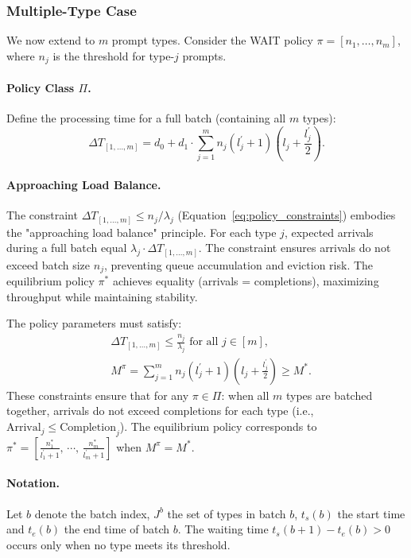 \subsubsection{Multiple-Type Case}

We now extend to $m$ prompt types. Consider the WAIT policy $\pi = [n_1,\ldots,n_m]$, where $n_j$ is the threshold for type-$j$ prompts.

\paragraph{Policy Class $\Pi$.} Define the processing time for a full batch (containing all $m$ types):
\begin{equation}\label{eq:batch_time_def}
\Delta T_{[1,\ldots,m]} =  d_0 + d_1 \cdot \sum_{j=1}^m n_j(l_j^\prime+1)\left( l_j+\frac{l_j^\prime}{2} \right).
\end{equation}

\paragraph{Approaching Load Balance.}
The constraint $\Delta T_{[1,\ldots,m]} \leq n_j/\lambda_j$ (Equation~\ref{eq:policy_constraints}) embodies the "approaching load balance" principle. For each type $j$, expected arrivals during a full batch equal $\lambda_j \cdot \Delta T_{[1,\ldots,m]}$. The constraint ensures arrivals do not exceed batch size $n_j$, preventing queue accumulation and eviction risk. The equilibrium policy $\pi^*$ achieves equality (arrivals = completions), maximizing throughput while maintaining stability.

The policy parameters must satisfy:
\begin{equation}\label{eq:policy_constraints}
\begin{aligned}
&\Delta T_{[1,\ldots,m]} \leq \frac{n_j}{\lambda_j} \text{ for all } j \in [m], \\
&M^{\pi} = \sum_{j=1}^mn_j(l_j^\prime+1)\left(l_j+\frac{l_j^\prime}{2}\right)\geq  M^{*}.
\end{aligned}
\end{equation}
These constraints ensure that for any $\pi \in \Pi$: when all $m$ types are batched together, arrivals do not exceed completions for each type (i.e., $\text{Arrival}_j\leq \text{Completion}_j$). The equilibrium policy corresponds to $\pi^* = [ \frac{n_1^*}{l_1^\prime+1},\,\cdots,\,\frac{n_m^*}{l_m^\prime+1} ]$ when $M^\pi = M^*$.

\paragraph{Notation.} Let $b$ denote the batch index, $J^b$ the set of types in batch $b$, $t_s(b)$ the start time and $t_e(b)$ the end time of batch $b$. The waiting time $t_s(b+1)-t_e(b)>0$ occurs only when no type meets its threshold.

